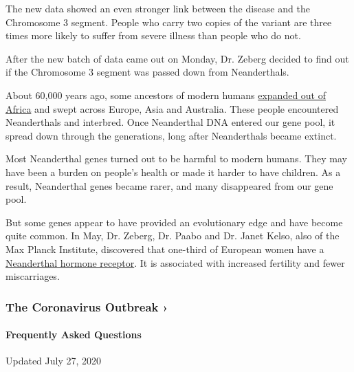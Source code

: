 The new data showed an even stronger link between the disease and the
Chromosome 3 segment. People who carry two copies of the variant are
three times more likely to suffer from severe illness than people who do
not.

After the new batch of data came out on Monday, Dr. Zeberg decided to
find out if the Chromosome 3 segment was passed down from Neanderthals.

About 60,000 years ago, some ancestors of modern humans
\href{https://www.nytimes.com/2020/01/31/science/neanderthal-dna-africa.html}{expanded
out of Africa} and swept across Europe, Asia and Australia. These people
encountered Neanderthals and interbred. Once Neanderthal DNA entered our
gene pool, it spread down through the generations, long after
Neanderthals became extinct.

Most Neanderthal genes turned out to be harmful to modern humans. They
may have been a burden on people's health or made it harder to have
children. As a result, Neanderthal genes became rarer, and many
disappeared from our gene pool.

But some genes appear to have provided an evolutionary edge and have
become quite common. In May, Dr. Zeberg, Dr. Paabo and Dr. Janet Kelso,
also of the Max Planck Institute, discovered that one-third of European
women have a
\href{https://academic.oup.com/mbe/article/doi/10.1093/molbev/msaa119/5841671}{Neanderthal
hormone receptor}. It is associated with increased fertility and fewer
miscarriages.

\href{https://www.nytimes.com/news-event/coronavirus?action=click\&pgtype=Article\&state=default\&region=MAIN_CONTENT_3\&context=storylines_faq}{}

\hypertarget{the-coronavirus-outbreak-}{%
\subsubsection{The Coronavirus Outbreak
›}\label{the-coronavirus-outbreak-}}

\hypertarget{frequently-asked-questions}{%
\paragraph{Frequently Asked
Questions}\label{frequently-asked-questions}}

Updated July 27, 2020

